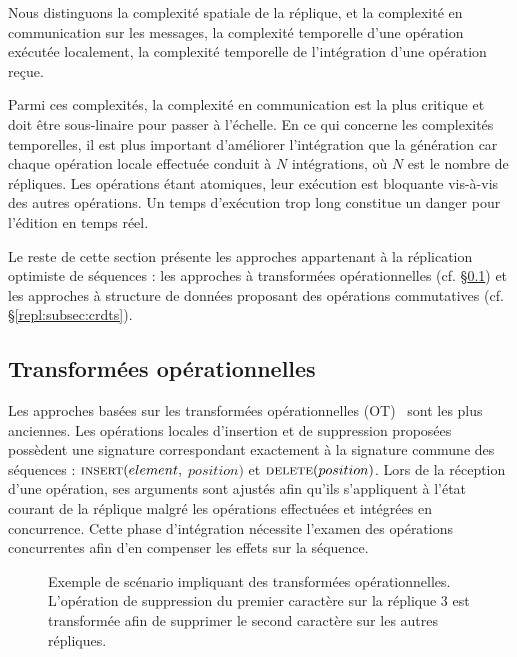 Nous distinguons la complexité spatiale de la réplique, et la complexité en
communication sur les messages, la complexité temporelle d'une opération
exécutée localement, la complexité temporelle de l'intégration d'une opération
reçue.

\noindent Parmi ces complexités, la complexité en communication est la plus
critique et doit être sous-linaire pour passer à l'échelle. En ce qui concerne
les complexités temporelles, il est plus important d'améliorer l'intégration que
la génération car chaque opération locale effectuée conduit à $N$ intégrations,
où $N$ est le nombre de répliques.  Les opérations étant atomiques, leur
exécution est bloquante vis-à-vis des autres opérations. Un temps d'exécution
trop long constitue un danger pour l'édition en temps réel.

Le reste de cette section présente les approches appartenant à la réplication
optimiste de séquences : les approches à transformées opérationnelles (cf.
§\ref{repl:subsec:ot}) et les approches à structure de données proposant des
opérations commutatives (cf. §\ref{repl:subsec:crdts}).

\subsection{Transformées opérationnelles}
\label{repl:subsec:ot}

Les approches basées sur les transformées opérationnelles
(OT)~\cite{sun1998operational, sun2009contextbased} sont les plus anciennes. Les
opérations locales d'insertion et de suppression proposées possèdent une
signature correspondant exactement à la signature commune des séquences :
$\textsc{insert}(element,$ $position)$ et $\textsc{delete}(position)$. Lors de
la réception d'une opération, ses arguments sont ajustés afin qu'ils
s'appliquent à l'état courant de la réplique malgré les opérations effectuées et
intégrées en concurrence. Cette phase d'intégration nécessite l'examen des
opérations concurrentes afin d'en compenser les effets sur la séquence.


\begin{figure}
  \centering
  
  \caption[Exemple de transformées opérationnelles] {\label{repl:fig:otexample}
    Exemple de scénario impliquant des transformées opérationnelles. L'opération
    de suppression du premier caractère sur la réplique 3 est transformée afin
    de supprimer le second caractère sur les autres répliques.}
\end{figure}

